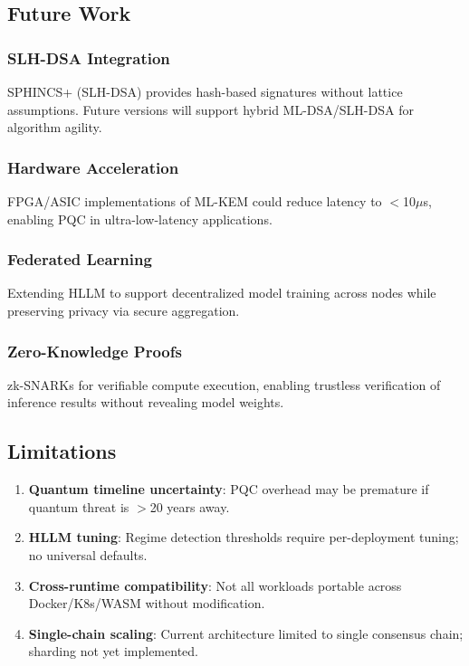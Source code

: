 \subsection{Future Work}

\subsubsection{SLH-DSA Integration}

SPHINCS+ (SLH-DSA) provides hash-based signatures without lattice assumptions. Future versions will support hybrid ML-DSA/SLH-DSA for algorithm agility.

\subsubsection{Hardware Acceleration}

FPGA/ASIC implementations of ML-KEM could reduce latency to $<$10$\mu$s, enabling PQC in ultra-low-latency applications.

\subsubsection{Federated Learning}

Extending HLLM to support decentralized model training across nodes while preserving privacy via secure aggregation.

\subsubsection{Zero-Knowledge Proofs}

zk-SNARKs for verifiable compute execution, enabling trustless verification of inference results without revealing model weights.

\subsection{Limitations}

\begin{enumerate}
\item \textbf{Quantum timeline uncertainty}: PQC overhead may be premature if quantum threat is $>$20 years away.

\item \textbf{HLLM tuning}: Regime detection thresholds require per-deployment tuning; no universal defaults.

\item \textbf{Cross-runtime compatibility}: Not all workloads portable across Docker/K8s/WASM without modification.

\item \textbf{Single-chain scaling}: Current architecture limited to single consensus chain; sharding not yet implemented.
\end{enumerate}

